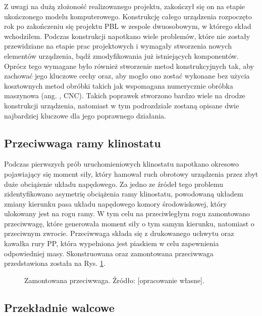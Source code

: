 Z uwagi na dużą złożoność realizowanego projektu, zakończył się on na etapie ukończonego modelu komputerowego. Konstrukcję całego urządzenia rozpoczęto rok po
   zakończeniu się projektu PBL w zespole dwuosobowym, w którego skład wchodziłem. Podczas
    konstrukcji napotkano wiele problemów, które nie zostały przewidziane na etapie prac
     projektowych i wymagały stworzenia nowych elementów urządzenia, bądź zmodyfikowania już
      istniejących komponentów. Oprócz tego wymagane było również stworzenie metod
       konstrukcyjnych tak, aby zachować jego kluczowe cechy oraz, aby mogło ono zostać wykonane
        bez użycia kosztownych metod obróbki takich jak wspomagana numerycznie obróbka maszynowa
         (ang. , CNC). Takich poprawek stworzono bardzo
          wiele \linebreak na drodze konstrukcji urządzenia, natomiast w tym podrozdziale zostaną opisane
           dwie najbardziej kluczowe dla jego poprawnego działania.
           

\subsection{Przeciwwaga ramy klinostatu}

Podczas pierwszych prób uruchomieniowych klinostatu napotkano okresowo pojawiający się moment
 siły, który hamował ruch obrotowy urządzenia przez zbyt duże obciążenie układu napędowego. Za
  jedno ze źródeł tego problemu zidentyfikowano asymetrię obciążenia ramy klinostatu, powodowaną
   układem zmiany kierunku pasa układu napędowego komory środowiskowej, który ulokowany jest na
    rogu ramy. W tym celu na przeciwległym rogu zamontowano przeciwwagę, które generowała moment
     siły o tym samym kierunku, natomiast o przeciwnym zwrocie. Przeciwwaga składa się z
      drukowanego uchwytu oraz kawałka rury PP, która wypełniona jest piaskiem w celu
       zapewnienia odpowiedniej masy. Skonstruowana oraz zamontowana przeciwwaga przedstawiona
        została na Rys. \ref{fig:przeciwwaga}.

\begin{figure}[H]
	\centering
	\setlength{\fboxsep}{0pt}
	\setlength{\fboxrule}{1pt}
	\caption{Zamontowana przeciwwaga. Źródło: [opracowanie własne].} 
	\label{fig:przeciwwaga}
\end{figure}

\subsection{Przekładnie walcowe}

